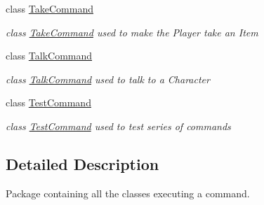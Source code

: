 \begin{DoxyCompactItemize}
class \hyperlink{classpkg__commands_1_1TakeCommand}{Take\-Command}
\begin{DoxyCompactList}\small\item\em class \hyperlink{classpkg__commands_1_1TakeCommand}{Take\-Command} used to make the Player take an Item \end{DoxyCompactList}\item 
class \hyperlink{classpkg__commands_1_1TalkCommand}{Talk\-Command}
\begin{DoxyCompactList}\small\item\em class \hyperlink{classpkg__commands_1_1TalkCommand}{Talk\-Command} used to talk to a Character \end{DoxyCompactList}\item 
class \hyperlink{classpkg__commands_1_1TestCommand}{Test\-Command}
\begin{DoxyCompactList}\small\item\em class \hyperlink{classpkg__commands_1_1TestCommand}{Test\-Command} used to test series of commands \end{DoxyCompactList}\end{DoxyCompactItemize}


\subsection{Detailed Description}
Package containing all the classes executing a command. 